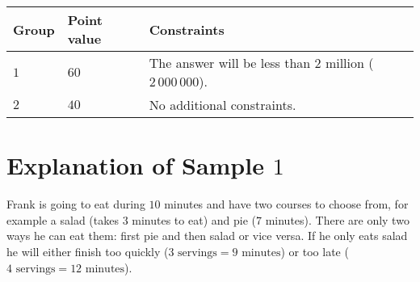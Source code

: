 \noindent
\begin{tabular}{| l | l | p{10cm} |}
    \hline
    \textbf{Group} & \textbf{Point value} & \textbf{Constraints} \\ \hline
    $1$    & $60$        & The answer will be less than $2$ million ($2\,000\,000$). \\ \hline 
    $2$    & $40$        & No additional constraints. \\ \hline
\end{tabular}

\section*{Explanation of Sample $1$}
Frank is going to eat during $10$ minutes and have two courses to choose from, for example a salad (takes $3$ minutes to eat) and pie ($7$ minutes).
There are only two ways he can eat them: first pie and then salad or vice versa.
If he only eats salad he will either finish too quickly ($3 \text{ servings} = 9 \text{ minutes}$) or too late ($4 \text{ servings} = 12 \text{ minutes}$).
